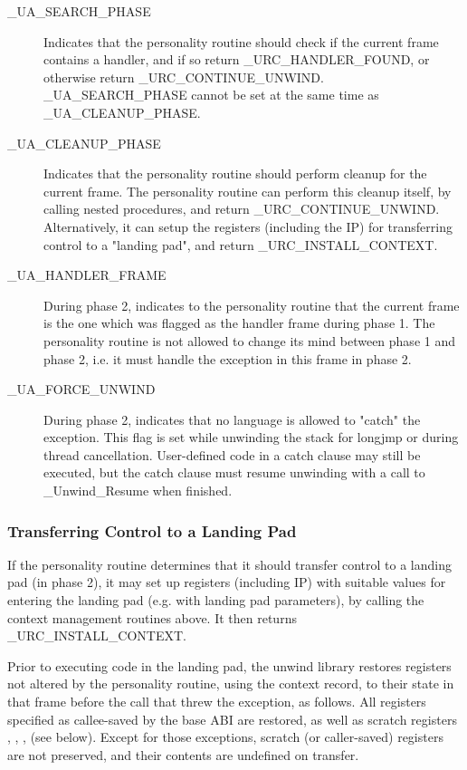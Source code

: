 \begin{description}
\item[\_UA\_SEARCH\_PHASE] Indicates that the personality routine should 
   check if the current frame contains a handler, and if so return
   \_URC\_HANDLER\_FOUND, or otherwise return \_URC\_CONTINUE\_UNWIND. 
   \_UA\_SEARCH\_PHASE cannot be set at the same time as \_UA\_CLEANUP\_PHASE. 

\item[\_UA\_CLEANUP\_PHASE] Indicates that the personality routine should 
   perform cleanup for the current frame. The personality routine can perform 
   this cleanup itself, by calling nested procedures, and return 
   \_URC\_CONTINUE\_UNWIND. Alternatively, it can setup the registers 
   (including the IP) for transferring control to a "landing pad", and 
   return \_URC\_INSTALL\_CONTEXT. 

\item[\_UA\_HANDLER\_FRAME]
   During phase 2, indicates to the personality routine that the current 
   frame is the one which was flagged as the handler frame during phase 1. 
   The personality routine is not allowed to change its mind between phase 1 
   and phase 2, i.e. it must handle the exception in this frame in phase 2. 

\item[\_UA\_FORCE\_UNWIND] During phase 2, indicates that no language is 
   allowed to "catch" the exception. This flag is set while unwinding the 
   stack for longjmp or during thread cancellation. User-defined code in a 
   catch clause may still be executed, but the catch clause must resume
   unwinding with a call to \_Unwind\_Resume when finished. 
\end{description}

\subsubsection{Transferring Control to a Landing Pad}

If the personality routine determines that it should transfer control to a 
landing pad (in phase 2), it may set up registers (including IP) with
suitable values for entering the landing pad (e.g. with landing pad 
parameters), by calling the context management routines above. It then
returns \_URC\_INSTALL\_CONTEXT. 

Prior to executing code in the landing pad, the unwind library restores 
registers not altered by the personality routine, using the context
record, to their state in that frame before the call that threw the exception, 
as follows. All registers specified as callee-saved by the base ABI are 
restored, as well as scratch registers \RDI, \RSI, \RDX, \RCX (see below). 
Except for those exceptions, scratch (or caller-saved) registers are not 
preserved, and their contents are undefined on transfer. 

